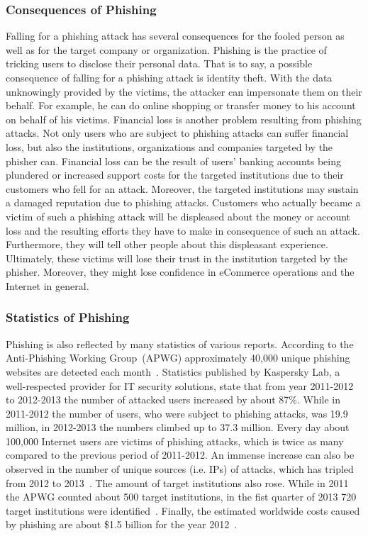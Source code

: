 \subsubsection{Consequences of Phishing}
Falling for a phishing attack has several consequences for the fooled person as well as for the target company or organization. Phishing is the practice of tricking users to disclose their personal data. That is to say, a possible consequence of falling for a phishing attack is identity theft. With the data unknowingly provided by the victims, the attacker can impersonate them on their behalf. For example, he can do online shopping or transfer money to his account on behalf of his victims. Financial loss is another problem resulting from phishing attacks. Not only users who are subject to phishing attacks can suffer financial loss, but also the institutions, organizations and companies targeted by the phisher can. Financial loss can be the result of users' banking accounts being plundered or increased support costs for the targeted institutions due to their customers who fell for an attack. Moreover, the targeted institutions may sustain a damaged reputation due to phishing attacks. Customers who actually became a victim of such a phishing attack will be displeased about the money or account loss and the resulting efforts they have to make in consequence of such an attack. Furthermore, they will tell other people about this displeasant experience. Ultimately, these victims will lose their trust in the institution targeted by the phisher. Moreover, they might lose confidence in eCommerce operations and the Internet in general.

\subsubsection{Statistics of Phishing}
\label{s:stats}
Phishing is also reflected by many statistics of various reports. According to the Anti-Phishing Working Group~(APWG) approximately 40,000 unique phishing websites are detected each month~\cite{antiphishingtrendreport2013}. Statistics published by Kaspersky Lab, a well-respected provider for IT security solutions, state that from year 2011-2012 to 2012-2013 the number of attacked users increased by about 87\%. While in 2011-2012 the number of users, who were subject to phishing attacks, was 19.9 million, in 2012-2013 the numbers climbed up to 37.3 million. Every day about 100,000 Internet users are victims of phishing attacks, which is twice as many compared to the previous period of 2011-2012. An immense increase can also be observed in the number of unique sources (i.e. IPs) of attacks, which has tripled from 2012 to 2013~\cite{kasperskyreport2013}. The amount of target institutions also rose. While in 2011 the APWG counted about 500 target institutions, in the fist quarter of 2013 720 target institutions were identified~\cite{antiphishingglobalreport2013}. Finally, the estimated worldwide costs caused by phishing are about \$1.5 billion for the year 2012~\cite{rsa2013}.

